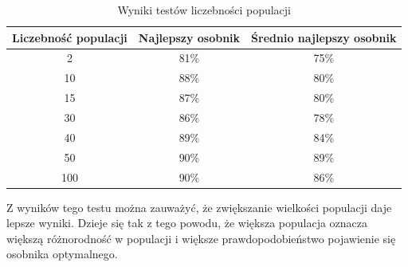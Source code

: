 \begin{table}[H]
    \centering
    \begin{tabular}{|c|c|c|}
    \hline
    Liczebność populacji    & Najlepszy osobnik & Średnio najlepszy osobnik \\ \hline
    2                       & 81\%              & 75\%                      \\ \hline
    10                      & 88\%              & 80\%                      \\ \hline
    15                      & 87\%              & 80\%                      \\ \hline
    30                      & 86\%              & 78\%                      \\ \hline
    40                      & 89\%              & 84\%                      \\ \hline
    50                      & 90\%              & 89\%                      \\ \hline
    100                     & 90\%              & 86\%                      \\ \hline
    \end{tabular}
    \caption{Wyniki testów liczebności populacji}
    \label{tab:crossing}
\end{table}

Z wyników tego testu można zauważyć, że zwiększanie wielkości populacji daje lepsze wyniki. Dzieje się tak z tego powodu, że większa populacja oznacza większą różnorodność w populacji i większe prawdopodobieństwo pojawienie się osobnika optymalnego.

